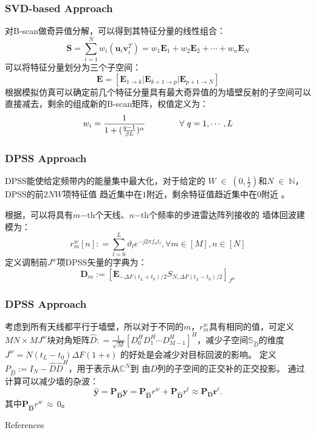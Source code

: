 \documentclass[11pt]{beamer}
\begin{document}
\begin{frame}
  \frametitle{SVD-based Approach}
  对B-scan做奇异值分解，可以得到其特征分量的线性组合：
  \begin{equation}
	{\boldsymbol S}=\sum_{i=1}^{N}w_{i}({\boldsymbol u}_{i}{\boldsymbol v}_{i}^{T})=w_{1}{\boldsymbol E}_{1}+w_{2}{\boldsymbol E}_{2}+\cdots+w_{n}{\boldsymbol E}_{N}
  \end{equation}
  可以将特征分量划分为三个子空间：
  \begin{equation}
	{\boldsymbol E}=[{\boldsymbol E}_{1\rightarrow k}\vert {\boldsymbol E}_{k+1\rightarrow p}\vert {\boldsymbol E}_{p+1\rightarrow N}]
  \end{equation}
  根据模拟仿真可以确定前几个特征分量具有最大奇异值的为墙壁反射的子空间可以
  直接减去，剩余的组成新的B-scan矩阵，权值定义为：
  \begin{equation}
	w_{i}={1\over 1+({q-1\over \beta L})^{\alpha}} \qquad\qquad\forall\ q=1, \cdots, L 
  \end{equation}
\end{frame}
\begin{frame}
  \frametitle{DPSS Approach}
  DPSS能使给定频带内的能量集中最大化\citep{Slepian1978Prolate}，对于给定的
  $W\; \in\; (0,\frac{1}{2})$和$N\;\in\;\mathbb{N}$，DPSS的前$2NW$项特征值
  趋近集中在$1$附近，剩余特征值趋近集中在$0$附近\citep{Zhu2015Approximating}
  。
  \par 根据\citep{Zhu2016On}，可以将具有$m\mathrm{-th}$个天线、$n\mathrm{-th}$个频率的步进雷达阵列接收的
  墙体回波建模为：
  \begin{equation}
  r_{m}^{w}[n]: =\displaystyle \sum_{l=0}^{L}\vartheta_{l}e^{-j2\pi f_{n}t_{l}}, \forall m\in[M], n\in[N]
  \end{equation}
  定义调制前$J^w$项DPSS矢量的字典为：
\begin{equation*} \pmb{D}_{m}:=[\pmb{E}_{-\Delta F(t_{L}+t_{0})/2}S_{N,\Delta F(t_{L}-t_{0})/2}]_{J^{w}} \end{equation*}
\end{frame}
\begin{frame}
  \frametitle{DPSS Approach}
  考虑到所有天线都平行于墙壁，所以对于不同的$m$，$r_{m}^w$具有相同的值，可定义
  $MN\times MJ^w$块对角矩阵$\hat D: = \frac{1}{\sqrt M}[D_{0}^{H}D_{1}^{H}\cdots D_{M-1}^{H}]^{H}$，减少子空间$\mathbb{S}_{\hat D}$的维度$J^w=N(t_L-t_0)\Delta F(1+\epsilon)$
  的好处是会减少对目标回波的影响。
  定义$P_{\hat{D}}:=I_{N}-\hat{D}\hat{D}^{H}$，用于表示从$\mathbb{C}^N$到
  由$\hat{D}$列的子空间的正交补的正交投影。 
  通过计算可以减少墙的杂波\citep{Zhu2015Wall}：
  \begin{equation*}
  \hat{\pmb{y}}=\pmb{P}_{\hat{\pmb{D}}}\pmb{y}=\pmb{P}_{\hat{\pmb{D}}}r^{w}+\pmb{P}_{\hat{\pmb{D}}}r^{t}\approx \pmb{P}_{\pmb{D}}\pmb{r}^{t}.
  \end{equation*}
  其中$\pmb{P}_{\hat{\pmb{D}}}r^w\,\approx \,0$。
\end{frame}
\begin{frame}[allowframebreaks]{References}
  \footnotesize
   
   
\end{frame}
\end{document}
